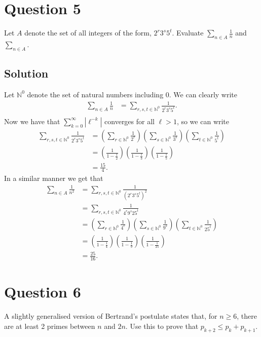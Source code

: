 \documentclass{unswmaths}
\begin{document}
\setlength\parindent{0pt}

\fancyfoot[r]{\today}

\section*{Question 5}
Let $ A $ denote the set of all integers of the form, $ 2^r3^s5^t $.
Evaluate $ \sum_{n \in A} \frac{1}{n} $ and $ \sum_{n\in A} $.
\subsection*{Solution}
Let $ \mathbb{N}^0 $ denote the set of natural numbers including 0.
We can clearly write
\begin{align*}
	\sum_{n  \in A} \frac{1}{n} &= \sum_{r,s,t \in \mathbb{N}^0} \frac{1}{2^r3^s5^t}. \\
\end{align*}
Now we have that $ \sum_{k=0}^\infty |\ell^{-k}| $ converges for all $ \ell > 1 $,
so we can write
\begin{align*}
	\sum_{r,s,t \in \mathbb{N}^0} \frac{1}{2^r3^s5^t} &= 
	\left( \sum_{r \in \mathbb{N}^0} \frac{1}{2^r} \right)
	\left( \sum_{s \in \mathbb{N}^0} \frac{1}{3^s} \right)
	\left( \sum_{t \in \mathbb{N}^0} \frac{1}{5^t} \right) \\
	&= \left( \frac{1}{1  -\frac{1}{2}} \right) \left( \frac{1}{1 - \frac{1}{3}} \right) \left( \frac{1}{1-\frac{1}{5}} \right) \\
	&= \frac{15}{4}.
\end{align*}
In a similar manner we get that 
\begin{align*}
	\sum_{n  \in A} \frac{1}{n^2} 
		&= \sum_{r,s,t \in \mathbb{N}^0} \frac{1}{\left(2^r3^s5^t\right)^2} \\
		&= \sum_{r,s,t \in \mathbb{N}^0} \frac{1}{4^r9^s25^t} \\
		&=
			\left( \sum_{r \in \mathbb{N}^0} \frac{1}{4^r} \right)
			\left( \sum_{s \in \mathbb{N}^0} \frac{1}{9^s} \right)
			\left( \sum_{t \in \mathbb{N}^0} \frac{1}{25^t} \right) \\
		&= \left( \frac{1}{1 - \frac{1}{4}} \right) \left( \frac{1}{1 - \frac{1}{9}} \right) \left( \frac{1}{1 - \frac{1}{25}} \right) \\
		&= \frac{25}{16}.
\end{align*}

\section*{Question 6}
A slightly generalised version of Bertrand's postulate states that, for
$ n \geq 6 $, there are at least 2 primes between $ n $ and $ 2n $. 
Use this to prove that $ p_{k+2} \leq p_k + p_{k+1} $.
\end{document}
